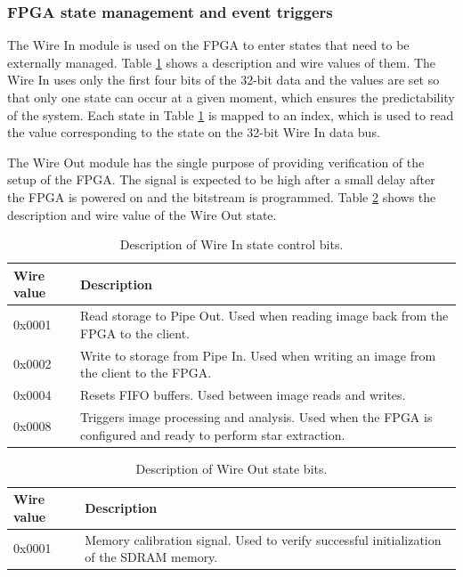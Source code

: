 \documentclass[12pt]{report}
\begin{document}
\subsubsection{FPGA state management and event triggers}
The Wire In module is used on the FPGA to enter states that need to be externally managed. Table \ref{table:wireInState} shows a description and wire values of them. The Wire In uses only the first four bits of the 32-bit data and the values are set so that only one state can occur at a given moment, which ensures the predictability of the system. Each state in Table \ref*{table:wireInState} is mapped to an index, which is used to read the value corresponding to the state on the 32-bit Wire In data bus. \citep{stpp}
\par
The Wire Out module has the single purpose of providing verification of the setup of the FPGA. The signal is expected to be high after a small delay after the FPGA is powered on and the bitstream is programmed. Table \ref*{table:wireOutState} shows the description and wire value of the Wire Out state. \citep{stpp}

\begin{table}[h]
    \begin{tabular}{|p{3cm}|p{10cm}|}
        \hline
        \textbf{Wire value}&\textbf{Description}\\
        \hline
        0x0001&Read storage to Pipe Out. Used when reading image back from the FPGA to the client.\\
        \hline
        0x0002&Write to storage from Pipe In. Used when writing an image from the client to the FPGA.\\ 
        \hline
        0x0004&Resets FIFO buffers. Used between image reads and writes. \\
        \hline
        0x0008&Triggers image processing and analysis. Used when the FPGA is configured and ready to perform star extraction.\\
        \hline
    \end{tabular}
    \caption{Description of Wire In state control bits.}
    \label{table:wireInState}
\end{table}
\begin{table}[h]
    \begin{tabular}{|p{3cm}|p{10cm}|}
        \hline
        \textbf{Wire value}&\textbf{Description}\\
        \hline
        0x0001&Memory calibration signal. Used to verify successful initialization of the SDRAM memory.\\
        \hline
    \end{tabular}
    \caption{Description of Wire Out state bits.}
    \label{table:wireOutState}
\end{table}
\end{document}
